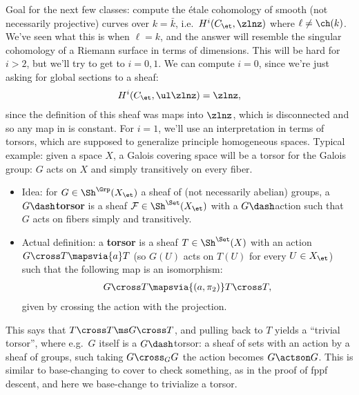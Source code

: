 Goal for the next few classes: compute the étale cohomology of smooth
(not necessarily projective) curves over \(k=\bar k\),
i.e.~\(H^i(C_\et, \zlnz)\) where \(\ell \neq \ch(k)\). We've seen what
this is when \(\ell = k\), and the answer will resemble the singular
cohomology of a Riemann surface in terms of dimensions. This will be
hard for \(i>2\), but we'll try to get to \(i=0, 1\). We can compute
\(i=0\), since we're just asking for global sections to a sheaf:
\begin{align*}  
H^i (C_\et, \ul\zlnz) = \zlnz
,\end{align*} since the definition of this sheaf was maps into
\(\zlnz\), which is disconnected and so any map in is constant. For
\(i=1\), we'll use an interpretation in terms of torsors, which are
supposed to generalize principle homogeneous spaces. Typical example:
given a space \(X\), a Galois covering space will be a torsor for the
Galois group: \(G\) acts on \(X\) and simply transitively on every
fiber.

\begin{definition}

\envlist

\begin{itemize}
\item
  Idea: for \(G\in\Sh^{\Grp}(X_\et)\) a sheaf of (not necessarily
  abelian) groups, a \textbf{\(G\dash\)torsor} is a sheaf
  \(\mathcal{F}\in \Sh^\Set(X_\et)\) with a \(G\dash\)action such that
  \(G\) acts on fibers simply and transitively.
\item
  Actual definition: a \textbf{torsor} is a sheaf \(T\in \Sh^\Set(X)\)
  with an action \(G\cross T \mapsvia{a} T\) (so \(G(U)\) acts on
  \(T(U)\) for every \(U\in X_\et\)) such that the following map is an
  isomorphism:
  \begin{align*}  
  G\cross T \mapsvia{(a, \pi_2)} T\cross T
  ,\end{align*} given by crossing the action with the projection.
\end{itemize}

\end{definition}

\begin{remark}

This says that \(T\cross T \ms G\cross T\), and pulling back to \(T\)
yields a ``trivial torsor'', where e.g.~\(G\) itself is a
\(G\dash\)torsor: a sheaf of sets with an action by a sheaf of groups,
such taking \(G\cross_G G\) the action becomes \(G\actson G\). This is
similar to base-changing to cover to check something, as in the proof of
fppf descent, and here we base-change to trivialize a torsor.

\end{remark}

